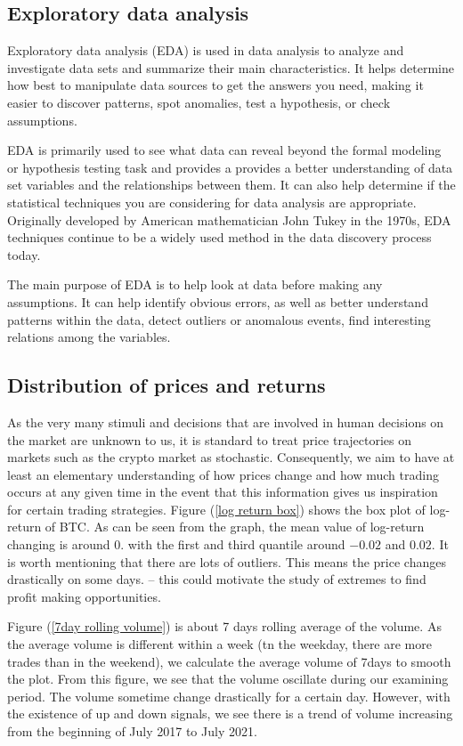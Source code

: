 \documentclass[twoside]{report}
\begin{document}
\begin{spacing}{1}
\section{Exploratory data analysis}
Exploratory data analysis (EDA) is used in data analysis to analyze and investigate data sets and summarize their main characteristics. It helps determine how best to manipulate data sources to get the answers you need, making it easier to discover patterns, spot anomalies, test a hypothesis, or check assumptions.

EDA is primarily used to see what data can reveal beyond the formal modeling or hypothesis testing task and provides a provides a better understanding of data set variables and the relationships between them. It can also help determine if the statistical techniques you are considering for data analysis are appropriate. Originally developed by American mathematician John Tukey in the 1970s, EDA techniques continue to be a widely used method in the data discovery process today.

The main purpose of EDA is to help look at data before making any assumptions. It can help identify obvious errors, as well as better understand patterns within the data, detect outliers or anomalous events, find interesting relations among the variables.



\subsection{Distribution of prices and returns}

As the very many stimuli and decisions that are involved in human decisions on the market are unknown to us, it is standard to treat price trajectories on markets such as the crypto market as stochastic. Consequently, we aim to have at least an elementary understanding of how prices change and how much trading occurs at any given time in the event that this information gives us inspiration for certain trading strategies. Figure (\ref{log return box}) shows the box plot of log-return of BTC. As can be seen from the graph, the mean value of log-return changing is around 0. with the first and third quantile around $-0.02$ and $0.02$. It is worth mentioning that there are lots of outliers. This means the price changes drastically on some days. -- this could motivate the study of extremes to find profit making opportunities. 

Figure (\ref{7day rolling volume}) is about 7 days rolling average of the volume. As the average volume is different within a week (tn the weekday, there are more trades than in the weekend), we calculate the average volume of 7days to smooth the plot. From this figure, we see that the volume oscillate during our examining period. The volume sometime change drastically for a certain day. However, with the existence of up and down signals, we see there is a trend of volume increasing from the beginning of July 2017 to July 2021.



\end{spacing}
\end{document}
